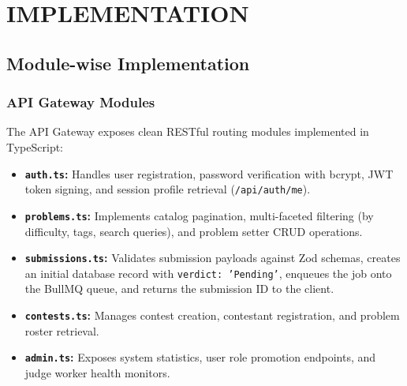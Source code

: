 \documentclass[12pt,a4paper]{report}
\begin{document}
\chapter{IMPLEMENTATION}

\section{Module-wise Implementation}

\subsection{API Gateway Modules}
The API Gateway exposes clean RESTful routing modules implemented in TypeScript:
\begin{itemize}[leftmargin=*]
  \item \textbf{\texttt{auth.ts}:} Handles user registration, password verification with bcrypt, JWT token signing, and session profile retrieval (\texttt{/api/auth/me}).
  \item \textbf{\texttt{problems.ts}:} Implements catalog pagination, multi-faceted filtering (by difficulty, tags, search queries), and problem setter CRUD operations.
  \item \textbf{\texttt{submissions.ts}:} Validates submission payloads against Zod schemas, creates an initial database record with \texttt{verdict: 'Pending'}, enqueues the job onto the BullMQ queue, and returns the submission ID to the client.
  \item \textbf{\texttt{contests.ts}:} Manages contest creation, contestant registration, and problem roster retrieval.
  \item \textbf{\texttt{admin.ts}:} Exposes system statistics, user role promotion endpoints, and judge worker health monitors.
\end{itemize}
\end{document}
